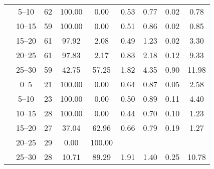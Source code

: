 \begin{table}[htb]
{\begin{tabular}{ccccccccc}
                                 & \SIrange{5}{10}{}               & 62                      & 100.00                & 0.00                  & 0.53                              & 0.77 & 0.02 & 0.78  \\
                                 & \SIrange{10}{15}{}              & 59                      & 100.00                & 0.00                  & 0.51                              & 0.86 & 0.02 & 0.85  \\
                                 & \SIrange{15}{20}{}              & 61                      & 97.92                 & 2.08                  & 0.49                              & 1.23 & 0.02 & 3.30  \\
                                 & \SIrange{20}{25}{}              & 61                      & 97.83                 & 2.17                  & 0.83                              & 2.18 & 0.12 & 9.33  \\
                                 & \SIrange{25}{30}{}              & 59                      & 42.75                 & 57.25                 & 1.82                              & 4.35 & 0.90 & 11.98 \\
            \addlinespace
            \multirow{6}{*}{C}   & \SIrange{0}{5}{}                & 21                      & 100.00                & 0.00                  & 0.64                              & 0.87 & 0.05 & 2.58  \\
                                 & \SIrange{5}{10}{}               & 23                      & 100.00                & 0.00                  & 0.50                              & 0.89 & 0.11 & 4.40  \\
                                 & \SIrange{10}{15}{}              & 28                      & 100.00                & 0.00                  & 0.44                              & 0.70 & 0.10 & 1.23  \\
                                 & \SIrange{15}{20}{}              & 27                      & 37.04                 & 62.96                 & 0.66                              & 0.79 & 0.19 & 1.27  \\
                                 & \SIrange{20}{25}{}              & 29                      & 0.00                  & 100.00                &                                   &      &      &       \\
                                 & \SIrange{25}{30}{}              & 28                      & 10.71                 & 89.29                 & 1.91                              & 1.40 & 0.25 & 10.78 \\
            \bottomrule
        \end{tabular}
    }
\end{table}
